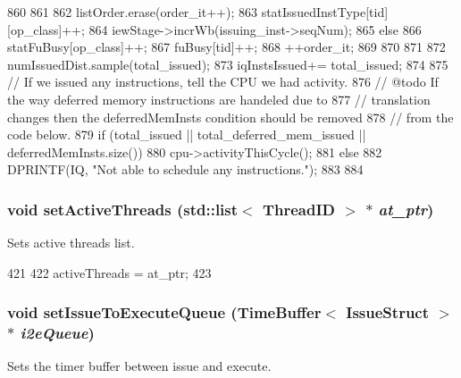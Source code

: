 \begin{DoxyCode}
{{{{860             }
861 
862             listOrder.erase(order_it++);
863             statIssuedInstType[tid][op_class]++;
864             iewStage->incrWb(issuing_inst->seqNum);
865         } else {
866             statFuBusy[op_class]++;
867             fuBusy[tid]++;
868             ++order_it;
869         }
870     }
871 
872     numIssuedDist.sample(total_issued);
873     iqInstsIssued+= total_issued;
874 
875     // If we issued any instructions, tell the CPU we had activity.
876     // @todo If the way deferred memory instructions are handeled due to
877     // translation changes then the deferredMemInsts condition should be removed
878     // from the code below.
879     if (total_issued || total_deferred_mem_issued || deferredMemInsts.size()) {
880         cpu->activityThisCycle();
881     } else {
882         DPRINTF(IQ, "Not able to schedule any instructions.\n");
883     }
884 }
\end{DoxyCode}
\hypertarget{classInstructionQueue_aab96bdacf8bd420402cbb543f994e054}{
\subsubsection[{setActiveThreads}]{\setlength{\rightskip}{0pt plus 5cm}void setActiveThreads ({\bf std::list}$<$ {\bf ThreadID} $>$ $\ast$ {\em at\_\-ptr})}}
\label{classInstructionQueue_aab96bdacf8bd420402cbb543f994e054}
Sets active threads list. 


\begin{DoxyCode}
421 {
422     activeThreads = at_ptr;
423 }
\end{DoxyCode}
\hypertarget{classInstructionQueue_a7cbe625b8c47621898e7ca92d70c826b}{
\subsubsection[{setIssueToExecuteQueue}]{\setlength{\rightskip}{0pt plus 5cm}void setIssueToExecuteQueue ({\bf TimeBuffer}$<$ {\bf IssueStruct} $>$ $\ast$ {\em i2eQueue})}}
\label{classInstructionQueue_a7cbe625b8c47621898e7ca92d70c826b}
Sets the timer buffer between issue and execute. 


